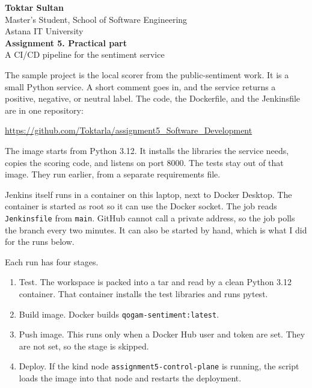 \documentclass[12pt,a4paper]{article}
\begin{document}
\begin{center}
\textbf{Toktar Sultan}\\
Master's Student, School of Software Engineering\\
Astana IT University\\[0.6em]
\textbf{Assignment 5. Practical part}\\
A CI/CD pipeline for the sentiment service
\end{center}

\vspace{0.4em}

\noindent
The sample project is the local scorer from the public-sentiment work. It is a small Python service. A short comment goes in, and the service returns a positive, negative, or neutral label. The code, the Dockerfile, and the Jenkinsfile are in one repository:

\begin{center}
\url{https://github.com/Toktarla/assignment5_Software_Development}
\end{center}

The image starts from Python 3.12. It installs the libraries the service needs, copies the scoring code, and listens on port 8000. The tests stay out of that image. They run earlier, from a separate requirements file.

Jenkins itself runs in a container on this laptop, next to Docker Desktop. The container is started as root so it can use the Docker socket. The job reads \texttt{Jenkinsfile} from \texttt{main}. GitHub cannot call a private address, so the job polls the branch every two minutes. It can also be started by hand, which is what I did for the runs below.

Each run has four stages.

\begin{enumerate}
    \item Test. The workspace is packed into a tar and read by a clean Python 3.12 container. That container installs the test libraries and runs pytest.
    \item Build image. Docker builds \texttt{qogam-sentiment:latest}.
    \item Push image. This runs only when a Docker Hub user and token are set. They are not set, so the stage is skipped.
    \item Deploy. If the kind node \texttt{assignment5-control-plane} is running, the script loads the image into that node and restarts the deployment.
\end{enumerate}
\end{document}
